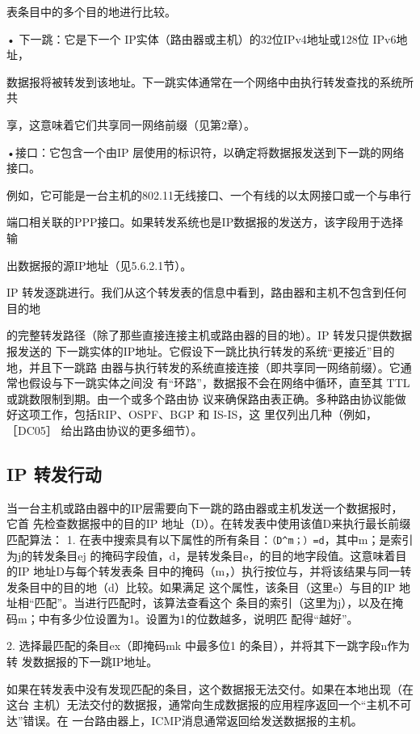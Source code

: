 表条目中的多个目的地进行比较。

• 下一跳：它是下一个 IP实体（路由器或主机）的32位IPv4地址或128位 IPv6地址，

数据报将被转发到该地址。下一跳实体通常在一个网络中由执行转发查找的系统所共

享，这意味着它们共享同一网络前缀（见第2章）。

•接口：它包含一个由IP 层使用的标识符，以确定将数据报发送到下一跳的网络接口。

例如，它可能是一台主机的802.11无线接口、一个有线的以太网接口或一个与串行

端口相关联的PPP接口。如果转发系统也是IP数据报的发送方，该字段用于选择输

出数据报的源IP地址（见5.6.2.1节）。

IP 转发逐跳进行。我们从这个转发表的信息中看到，路由器和主机不包含到任何目的地

的完整转发路径（除了那些直接连接主机或路由器的目的地）。IP 转发只提供数据报发送的
下一跳实体的IP地址。它假设下一跳比执行转发的系统“更接近”目的地，并且下一跳路
由器与执行转发的系统直接连接（即共享同一网络前缀）。它通常也假设与下一跳实体之间没
有“环路”，数据报不会在网络中循环，直至其 TTL 或跳数限制到期。由一个或多个路由协
议来确保路由表正确。多种路由协议能做好这项工作，包括RIP、OSPF、BGP 和 IS-IS，这
里仅列出几种（例如，［DC05］ 给出路由协议的更多细节）。

\subsection{IP 转发行动}
当一台主机或路由器中的IP层需要向下一跳的路由器或主机发送一个数据报时，它首
先检查数据报中的目的IP 地址（D）。在转发表中使用该值D来执行最长前缀匹配算法：
1. 在表中搜索具有以下属性的所有条目：\verb|（D^m；）=d|，其中m；是索引为j的转发条目ej
的掩码字段值，d，是转发条目e，的目的地字段值。这意味着目的IP 地址D与每个转发表条
目中的掩码（m，）执行按位与，并将该结果与同一转发条目中的目的地（d）比较。如果满足
这个属性，该条目（这里e）与目的IP 地址相“匹配”。当进行匹配时，该算法查看这个
条目的索引（这里为j），以及在掩码m；中有多少位设置为1。设置为1的位数越多，说明匹
配得“越好”。

2. 选择最匹配的条目ex（即掩码mk 中最多位1 的条目），并将其下一跳字段n作为转
发数据报的下一跳IP地址。

如果在转发表中没有发现匹配的条目，这个数据报无法交付。如果在本地出现（在这台
主机）无法交付的数据报，通常向生成数据报的应用程序返回一个“主机不可达”错误。在
一台路由器上，ICMP消息通常返回给发送数据报的主机。

